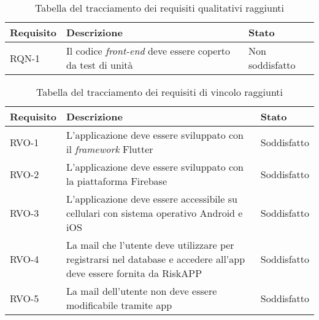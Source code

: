 \newpage

\begin{table}[htb]%
\caption{Tabella del tracciamento dei requisiti qualitativi raggiunti}
\label{tab:reqqualitativi-raggiunti}
\begin{tabularx}{\textwidth}{lXl}
\hline
\textbf{Requisito} & \textbf{Descrizione} & \textbf{Stato}\\
\hline\hline
RQN-1    & Il codice \emph{front-end} deve essere coperto da test di unità & Non soddisfatto \\
\hline
\end{tabularx}
\end{table}%

\begin{table}[htb]%
\caption{Tabella del tracciamento dei requisiti di vincolo raggiunti}
\label{tab:reqvincolo-raggiunti}
\begin{tabularx}{\textwidth}{lXl}
\hline
\textbf{Requisito} & \textbf{Descrizione} & \textbf{Stato}\\
\hline\hline
RVO-1    & L'applicazione deve essere sviluppato con il \emph{framework} Flutter & Soddisfatto \\
\hline
RVO-2    & L'applicazione deve essere sviluppato con la piattaforma Firebase & Soddisfatto \\
\hline
RVO-3    & L'applicazione deve essere accessibile su cellulari con sistema operativo Android e iOS & Soddisfatto \\
\hline
RVO-4    & La mail che l'utente deve utilizzare per registrarsi nel database e accedere all'app deve essere fornita da RiskAPP & Soddisfatto \\
\hline
RVO-5    & La mail dell'utente non deve essere modificabile tramite app & Soddisfatto \\
\hline
\end{tabularx}
\end{table}%


